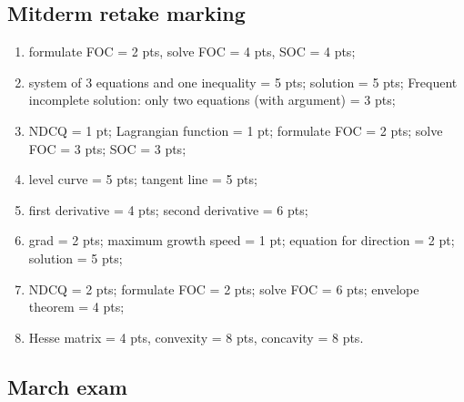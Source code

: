 \documentclass[12pt]{article} %
\theoremstyle{definition} %
\begin{document}
\subsection{Mitderm retake marking}
\begin{enumerate}
  \item formulate FOC = 2 pts, solve FOC = 4 pts, SOC = 4 pts;
  \item system of 3 equations and one inequality = 5 pts; solution = 5 pts; Frequent incomplete solution: only two equations (with argument) = 3 pts;
  \item NDCQ =  1 pt; Lagrangian function = 1 pt; formulate FOC = 2 pts; solve FOC = 3 pts; SOC = 3 pts;
  \item level curve = 5 pts; tangent line = 5 pts;
  \item first derivative = 4 pts; second derivative = 6 pts;
  \item grad = 2 pts; maximum growth speed = 1 pt; equation for direction = 2 pt; solution = 5 pts;
  \item NDCQ = 2 pts; formulate FOC = 2 pts; solve FOC = 6 pts; envelope theorem = 4 pts;
  \item Hesse matrix = 4 pts, convexity = 8 pts, concavity = 8 pts.
\end{enumerate}


\subsection{March exam}
\end{document}
